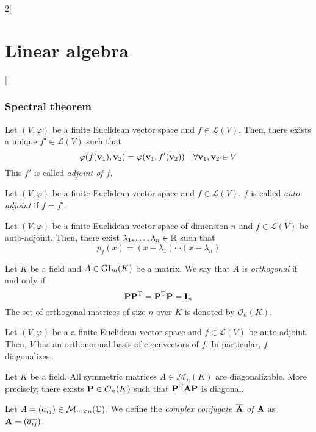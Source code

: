 \documentclass[../../../main.tex]{subfiles}
\begin{document}
\begin{multicols}{2}[\section{Linear algebra}]
  \subsubsection*{Spectral theorem}
  \begin{definition}
    Let $(V,\varphi)$ be a finite Euclidean vector space and $f\in\mathcal{L}(V)$. Then, there exists a unique $f'\in\mathcal{L}(V)$ such that $$\varphi(f(\vb{v}_1),\vb{v}_2)=\varphi(\vb{v}_1,f'(\vb{v}_2))\quad\forall \vb{v}_1,\vb{v}_2\in V$$ This $f'$ is called \textit{adjoint of $f$}.
  \end{definition}
  \begin{definition}
    Let $(V,\varphi)$ be a finite Euclidean vector space and $f\in\mathcal{L}(V)$. $f$ is called \textit{auto-adjoint} if $f=f'$.
  \end{definition}
  \begin{lemma}
    Let $(V,\varphi)$ be a finite Euclidean vector space of dimension $n$ and $f\in\mathcal{L}(V)$ be auto-adjoint. Then, there exist $\lambda_1,\ldots,\lambda_n\in\mathbb{R}$ such that $$p_f(x)=(x-\lambda_1 )\cdots(x-\lambda_n)$$
  \end{lemma}
  \begin{definition}
    Let $K$ be a field and $A\in\mathrm{GL}_n(K)$ be a matrix. We say that $A$ is \textit{orthogonal} if and only if $$\vb{P}\vb{P}^{\mathrm{T}}=\vb{P}^{\mathrm{T}}\vb{P}=\vb{I}_n$$ The set of orthogonal matrices of size $n$ over $K$ is denoted by $\mathcal{O}_n(K)$.
  \end{definition}
  \begin{theorem}
    Let $(V,\varphi)$ be a a finite Euclidean vector space and $f\in\mathcal{L}(V)$ be auto-adjoint. Then, $V$ has an orthonormal basis of eigenvectors of $f$. In particular, $f$ diagonalizes.
  \end{theorem}
  \begin{corollary}
    Let $K$ be a field. All symmetric matrices $A\in\mathcal{M}_n(K)$ are diagonalizable. More precisely, there exists $\vb{P}\in\mathcal{O}_n(K)$ such that $\vb{P}^{\mathrm{T}}\vb{A}\vb{P}$ is diagonal.
  \end{corollary}
  \begin{definition}
    Let $A=(a_{ij})\in\mathcal{M}_{m\times n}(\mathbb{C})$. We define the \textit{complex conjugate $\overline{\vb{A}}$ of $\vb{A}$} as $\overline{\vb{A}}=(\overline{a_{ij}})$.
  \end{definition}
  \begin{prop}

\end{prop}
\end{multicols}
\end{document}
